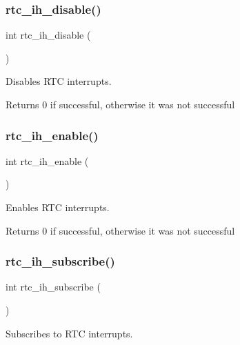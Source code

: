 \subsubsection{\texorpdfstring{rtc\+\_\+ih\+\_\+disable()}{rtc\_ih\_disable()}}
{\footnotesize\ttfamily int rtc\+\_\+ih\+\_\+disable (\begin{DoxyParamCaption}{ }\end{DoxyParamCaption})}



Disables R\+TC interrupts. 

\begin{DoxyReturn}{Returns}
0 if successful, otherwise it was not successful 
\end{DoxyReturn}
\mbox{\label{group__rtc_ga272e00608ea1e5f0e931ae7a566c2af4}} 
\subsubsection{\texorpdfstring{rtc\+\_\+ih\+\_\+enable()}{rtc\_ih\_enable()}}
{\footnotesize\ttfamily int rtc\+\_\+ih\+\_\+enable (\begin{DoxyParamCaption}{ }\end{DoxyParamCaption})}



Enables R\+TC interrupts. 

\begin{DoxyReturn}{Returns}
0 if successful, otherwise it was not successful 
\end{DoxyReturn}
\mbox{\label{group__rtc_gaa9a633f60d6ee3b237a80b408647908c}} 
\subsubsection{\texorpdfstring{rtc\+\_\+ih\+\_\+subscribe()}{rtc\_ih\_subscribe()}}
{\footnotesize\ttfamily int rtc\+\_\+ih\+\_\+subscribe (\begin{DoxyParamCaption}{ }\end{DoxyParamCaption})}



Subscribes to R\+TC interrupts. 

